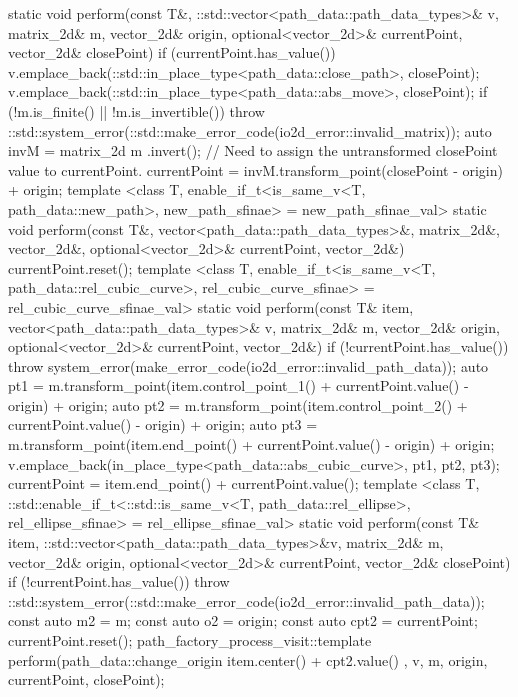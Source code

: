 \begin{codeblock}
{{      static void perform(const T&, ::std::vector<path_data::path_data_types>& v, matrix_2d& m, vector_2d& origin, optional<vector_2d>& currentPoint, vector_2d& closePoint) {
        if (currentPoint.has_value()) {
          v.emplace_back(::std::in_place_type<path_data::close_path>, closePoint);
          v.emplace_back(::std::in_place_type<path_data::abs_move>,
            closePoint);
          if (!m.is_finite() || !m.is_invertible()) {
            throw ::std::system_error(::std::make_error_code(io2d_error::invalid_matrix));
          }
          auto invM = matrix_2d{ m }.invert();
          // Need to assign the untransformed closePoint value to currentPoint.
          currentPoint = invM.transform_point(closePoint - origin) + origin;
        }
      }
      template <class T, enable_if_t<is_same_v<T, path_data::new_path>, new_path_sfinae> = new_path_sfinae_val>
      static void perform(const T&, vector<path_data::path_data_types>&, matrix_2d&, vector_2d&, optional<vector_2d>& currentPoint, vector_2d&) {
        currentPoint.reset();
      }
      template <class T, enable_if_t<is_same_v<T, path_data::rel_cubic_curve>, rel_cubic_curve_sfinae> = rel_cubic_curve_sfinae_val>
      static void perform(const T& item, vector<path_data::path_data_types>& v, matrix_2d& m, vector_2d& origin, optional<vector_2d>& currentPoint, vector_2d&) {
        if (!currentPoint.has_value()) {
          throw system_error(make_error_code(io2d_error::invalid_path_data));
        }
        auto pt1 = m.transform_point(item.control_point_1() + currentPoint.value() -
          origin) + origin;
        auto pt2 = m.transform_point(item.control_point_2() + currentPoint.value() -
          origin) + origin;
        auto pt3 = m.transform_point(item.end_point() + currentPoint.value() - origin) +
          origin;
        v.emplace_back(in_place_type<path_data::abs_cubic_curve>,
          pt1, pt2, pt3);
        currentPoint = item.end_point() + currentPoint.value();
      }
      template <class T, ::std::enable_if_t<::std::is_same_v<T, path_data::rel_ellipse>, rel_ellipse_sfinae> = rel_ellipse_sfinae_val>
      static void perform(const T& item, ::std::vector<path_data::path_data_types>&v, matrix_2d& m, vector_2d& origin, optional<vector_2d>& currentPoint, vector_2d& closePoint) {
        if (!currentPoint.has_value()) {
          throw ::std::system_error(::std::make_error_code(io2d_error::invalid_path_data));
        }
        const auto m2 = m;
        const auto o2 = origin;
        const auto cpt2 = currentPoint;
        currentPoint.reset();
        path_factory_process_visit::template perform(path_data::change_origin{ item.center() + cpt2.value() }, v, m, origin, currentPoint, closePoint);
}}}
\end{codeblock}
